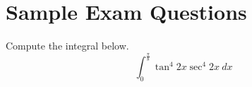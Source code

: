 \documentclass{ximera}
\begin{document}
\section*{Sample Exam Questions}

\begin{question}%

Compute the integral below.
\[ \int_0^{\frac{\pi}{8}} \tan^4 2x \sec^4 2x ~ dx \]
\begin{multiplechoice}
\end{multiplechoice}

\end{question}
\end{document}
